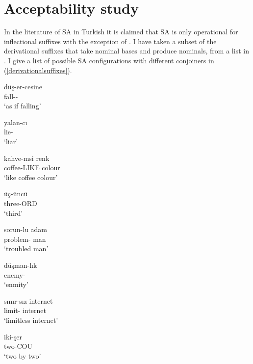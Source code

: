 \section{Acceptability study}

In the literature of SA in Turkish it is claimed that SA is only operational for inflectional suffixes \citep{orgun1995flat,kornfilt1996some,broadwell2008turkish, kornfilt2012revisiting} with the exception of \cite{akkucs2016suspended}. I have taken a subset of the derivational suffixes that take nominal bases and produce nominals, from a list in \cite{goksel2004turkish}. I give a list of possible SA configurations with different conjoiners in (\ref{derivationalsuffixes}).


\begin{exe}
  \begin{multicols}{2}
    \ex \label{derivationalsuffixes}
    \begin{xlist}
        \ex 
        \gll 
        düş-er-cesine \\ fall-{\Aor}-{\Casina} \\
        \glt `as if falling'
        
        \ex 
        \gll 
        yalan-cı \\ lie-{\Ci} \\ 
        \glt `liar'
        
        \ex 
        \gll 
        kahve-msi renk \\ coffee-LIKE colour \\
        \glt `like coffee colour'

        \ex 
        \gll 
        üç-üncü \\ three-ORD \\
        \glt `third'
        
\columnbreak

        \ex 
        \gll 
        sorun-lu adam \\ problem-{\Inc} man \\
        \glt `troubled man'
        
        \ex 
        \gll 
        düşman-lık \\ enemy-{\Lik} \\
        \glt `enmity'
        
        \ex 
        \gll 
        sınır-sız internet \\ limit-{\Exc} internet \\
        \glt `limitless internet'
        
        \ex 
        \gll 
        iki-şer \\ two-COU \\
        \glt `two by two'
        
    
    \end{xlist}
    \end{multicols}
\end{exe}

